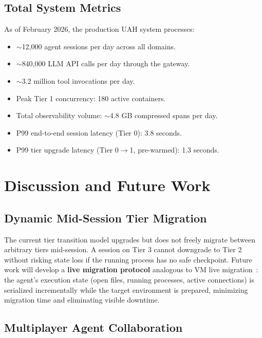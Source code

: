 \documentclass[11pt]{article}
\begin{document}
\subsection{Total System Metrics}

As of February 2026, the production UAH system processes:
\begin{itemize}[leftmargin=1.5em]
    \item $\sim$12,000 agent sessions per day across all domains.
    \item $\sim$840,000 LLM API calls per day through the gateway.
    \item $\sim$3.2 million tool invocations per day.
    \item Peak Tier 1 concurrency: 180 active containers.
    \item Total observability volume: $\sim$4.8 GB compressed spans per day.
    \item P99 end-to-end session latency (Tier 0): 3.8 seconds.
    \item P99 tier upgrade latency (Tier 0$\to$1, pre-warmed): 1.3 seconds.
\end{itemize}

\section{Discussion and Future Work}
\label{sec:discussion}

\subsection{Dynamic Mid-Session Tier Migration}

The current tier transition model upgrades but does not freely migrate
between arbitrary tiers mid-session. A session on Tier 3 cannot downgrade
to Tier 2 without risking state loss if the running process has no safe
checkpoint. Future work will develop a \textbf{live migration protocol}
analogous to VM live migration~\cite{clark2005live}: the agent's execution
state (open files, running processes, active connections) is serialized
incrementally while the target environment is prepared, minimizing migration
time and eliminating visible downtime.

\subsection{Multiplayer Agent Collaboration}
\end{document}

